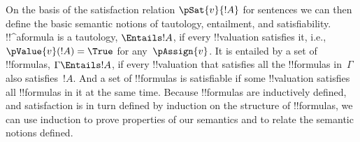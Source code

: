 \documentclass[../../../include/open-logic-section]{subfiles}
\begin{document}
On the basis of the satisfaction relation $\pSat{v}{!A}$ for sentences
we can then define the basic semantic notions of tautology,
entailment, and satisfiability.  !!^a{formula} is a tautology,
$\Entails !A$, if every !!{valuation} satisfies it, i.e.,
$\pValue{v}(!A) = \True$ for any~$\pAssign{v}$. It is entailed by a
set of !!{formula}s, $\Gamma \Entails !A$, if every !!{valuation} that
satisfies all the !!{formula}s in~$\Gamma$ also satisfies~$!A$. And a
set of !!{formula}s is satisfiable if some !!{valuation} satisfies all
!!{formula}s in it at the same time.  Because !!{formula}s are
inductively defined, and satisfaction is in turn defined by induction
on the structure of !!{formula}s, we can use induction to prove
properties of our semantics and to relate the semantic notions
defined.
\end{document}

